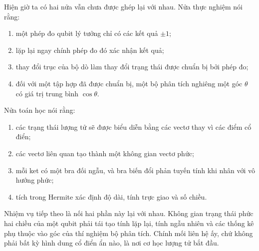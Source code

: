 Hiện giờ ta có hai nửa vẫn chưa được ghép lại với nhau. Nửa thực nghiệm nói rằng:
\begin{enumerate}
  \item một phép đo qubit lý tưởng chỉ có các kết quả \(\pm1\);
  \item lặp lại ngay chính phép đo đó xác nhận kết quả;
  \item thay đổi trục của bộ dò làm thay đổi trạng thái được chuẩn bị bởi phép đo;
  \item đối với một tập hợp đã được chuẩn bị, một bộ phân tích nghiêng một góc \(\theta\) có giá trị trung bình \(\cos\theta\).
\end{enumerate}
Nửa toán học nói rằng:
\begin{enumerate}
  \item các trạng thái lượng tử sẽ được biểu diễn bằng các vectơ thay vì các điểm cổ điển;
  \item các vectơ liên quan tạo thành một không gian vectơ phức;
  \item mỗi ket có một bra đối ngẫu, và bra biến đổi phản tuyến tính khi nhân với vô hướng phức;
  \item tích trong Hermite xác định độ dài, tính trực giao và số chiều.
\end{enumerate}

Nhiệm vụ tiếp theo là nối hai phần này lại với nhau. Không gian trạng thái phức hai chiều của một qubit phải tái tạo tính lặp lại, tính ngẫu nhiên và các thống kê phụ thuộc vào góc của thí nghiệm bộ phân tích. Chính mối liên hệ ấy, chứ không phải bất kỳ hình dung cổ điển ẩn nào, là nơi cơ học lượng tử bắt đầu.

